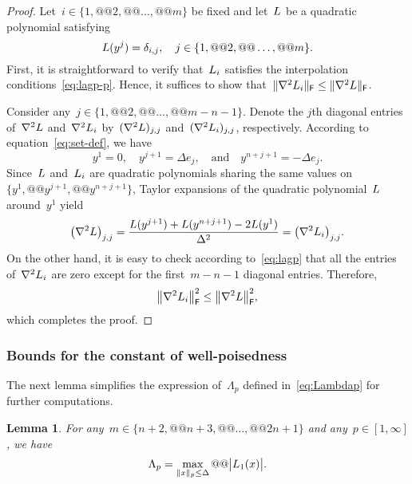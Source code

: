 \documentclass{article}
\numberwithin{equation}{section}
\theoremstyle{definition}
\theoremstyle{plain}
\newtheorem{lemma}{Lemma}[section]
\theoremstyle{remark}
\newcommand*{\abs}[2][]{#1\lvert#2#1\rvert}
\newcommand*{\norm}[2][]{#1\lVert#2#1\rVert}
\newcommand*{\set}[2][]{#1\{#2#1\}}
\newcommand*{\lagp}[1][]{L\ifblank{#1}{}{_{#1}}}
\begin{document}
\begin{proof}
    Let~$i \in \set{1, @@ 2, @@ \dots, @@ m}$ be fixed and let~$\lagp$ be a quadratic polynomial satisfying
    \begin{equation}
        \label{eq:lagp-p}
        \lagp(y^j) = \delta_{i, j}, \quad j \in \set{1, @@ 2, @@ \dots, @@ m}.
    \end{equation}
    First, it is straightforward to verify that~$\lagp[i]$ satisfies the interpolation conditions~\eqref{eq:lagp-p}.
    Hence, it suffices to show that~$\norm{\nabla^2 \lagp[i]}_\mathsf{F} \le \norm{\nabla^2 \lagp}_\mathsf{F}$.

    Consider any~$j \in \set{1, @@ 2, @@ \dots, @@ m - n - 1}$.
    Denote the $j$th diagonal entries of~$\nabla^2 \lagp$ and~$\nabla^2 \lagp[i]$ by~$(\nabla^2 \lagp)_{j, j}$ and~$(\nabla^2 \lagp[i])_{j, j}$, respectively.
    According to equation~\eqref{eq:set-def}, we have
    \begin{equation*}
        y^1 = 0, \quad y^{j + 1} = \Delta e_j, \quad \text{and} \quad y^{n + j + 1} = -\Delta e_j.
    \end{equation*}
    Since~$\lagp$ and~$\lagp[i]$ are quadratic polynomials sharing the same values on~$\set{y^1, @@ y^{j + 1}, @@ y^{n + j + 1}}$, Taylor expansions of the quadratic polynomial~$\lagp$ around~$y^1$ yield
    \begin{equation*}
        \big(\nabla^2 \lagp \big)_{j, j} = \frac{\lagp(y^{j + 1}) + \lagp(y^{n + j + 1}) - 2 \lagp(y^1)}{\Delta^2} = \big(\nabla^2 \lagp[i] \big)_{j, j}.
    \end{equation*}
    On the other hand, it is easy to check according to~\eqref{eq:lagp} that all the entries of~$\nabla^2 \lagp[i]$ are zero except for the first~$m-n-1$ diagonal entries.
    Therefore,
    \begin{equation*}
        \norm[\big]{\nabla^2 \lagp[i]}_{\mathsf{F}}^2 \le \norm[\big]{\nabla^2 \lagp}_{\mathsf{F}}^2,
    \end{equation*}
    which completes the proof.
\end{proof}

\subsubsection{Bounds for the constant of well-poisedness}

The next lemma simplifies the expression of~$\Lambda_p$ defined in~\eqref{eq:Lambdap} for further computations.

\begin{lemma}
    \label{lem:lambda-p}
    For any~$m \in \set{n + 2, @@ n + 3, @@ \dots, @@ 2n + 1}$ and any~$p \in [1, \infty]$, we have
    \begin{equation}
        \label{eq:lambda-p}
        \Lambda_p = \max_{\norm{x}_p \le \Delta} @@ \abs[\big]{\lagp[1](x)}.
    \end{equation}
\end{lemma}
\end{document}
